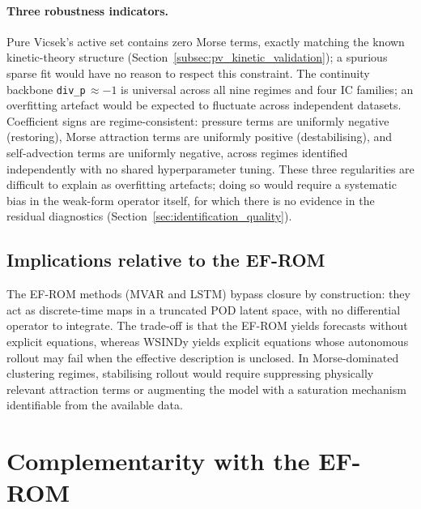 \paragraph{Three robustness indicators.}
Pure Vicsek's active set contains zero Morse terms, exactly matching the
known kinetic-theory structure
(Section~\ref{subsec:pv_kinetic_validation}); a spurious sparse fit
would have no reason to respect this constraint.
The continuity backbone \texttt{div\_p}$\,\approx -1$ is universal
across all nine regimes and four IC families; an overfitting artefact
would be expected to fluctuate across independent datasets.
Coefficient signs are regime-consistent: pressure terms are uniformly
negative (restoring), Morse attraction terms are uniformly positive
(destabilising), and self-advection terms are uniformly negative, across
regimes identified independently with no shared hyperparameter tuning.
These three regularities are difficult to explain as overfitting artefacts;
doing so would require a systematic bias in the weak-form operator itself,
for which there is no evidence in the residual diagnostics
(Section~\ref{sec:identification_quality}).

\subsection{Implications relative to the EF-ROM}

The EF-ROM methods (MVAR and LSTM) bypass closure by construction: they
act as discrete-time maps in a truncated POD latent space, with no
differential operator to integrate.  The trade-off is that the EF-ROM
yields forecasts without explicit equations, whereas WSINDy yields
explicit equations whose autonomous rollout may fail when the effective
description is unclosed.
In Morse-dominated clustering regimes, stabilising rollout
would require suppressing physically relevant attraction terms or
augmenting the model with a saturation mechanism identifiable from the
available data.

\section{Complementarity with the EF-ROM}
\label{sec:wsindy_complementarity}


